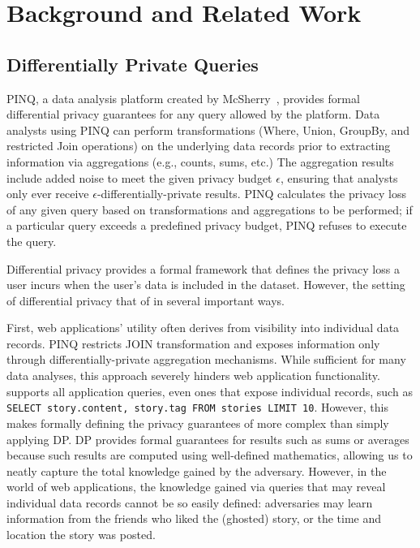\section{Background and Related Work}

\subsection{Differentially Private Queries}

PINQ, a data analysis platform created by McSherry~\cite{pinq}, provides formal differential privacy
guarantees for any query allowed by the platform.  Data analysts using PINQ can perform
transformations (Where, Union, GroupBy, and restricted Join operations) on the underlying data
records prior to extracting information via aggregations (e.g., counts, sums, etc.) The aggregation
results include added noise to meet the given privacy budget $\epsilon$, ensuring that analysts only
ever receive $\epsilon$-differentially-private results.  PINQ calculates the privacy loss of any
given query based on transformations and aggregations to be performed; if a particular query exceeds
a predefined privacy budget, PINQ refuses to execute the query.

Differential privacy provides a formal framework that defines the privacy loss a user incurs
when the user's data is included in the dataset. However, the setting of differential privacy
that of \sys{} in several important ways. 

First, web applications' utility often derives from visibility into individual data records. PINQ
restricts JOIN transformation and exposes information only through differentially-private
aggregation mechanisms. While sufficient for many data analyses, this approach severely hinders web
application functionality. \sys{} supports all application queries, even ones that expose individual
records, such as \texttt{SELECT story.content, story.tag FROM stories LIMIT 10}.  
However, this makes formally defining the privacy guarantees of \sys{} more complex than
simply applying DP.  DP provides formal guarantees for results such as sums or averages because such
results are computed using well-defined mathematics, allowing us to neatly capture the total
knowledge gained by the adversary. However, in the world of web applications, the knowledge gained
via queries that may reveal individual data records cannot be so easily defined: adversaries may
learn information from the friends who liked the (ghosted) story, or the time and location the story
was posted.

